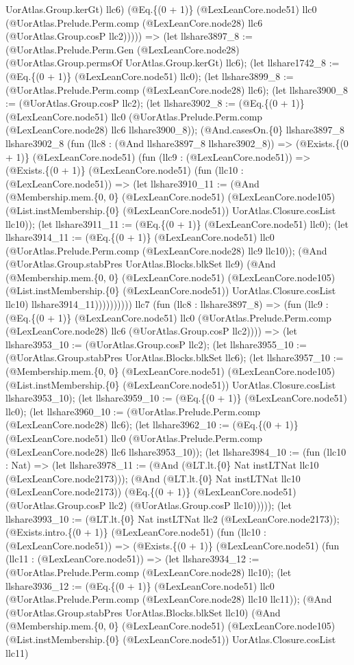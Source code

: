 \documentclass[11pt]{article}
\begin{document}
UorAtlas.Group.kerGt) llc6) (@Eq.\{(0 + 1)\} (@LexLeanCore.node51) llc0 (@UorAtlas.Prelude.Perm.comp (@LexLeanCore.node28) llc6 (@UorAtlas.Group.cosP llc2))))) => (let llshare3897\_8 := (@UorAtlas.Prelude.Perm.Gen (@LexLeanCore.node28) (@UorAtlas.Group.permsOf UorAtlas.Group.kerGt) llc6); (let llshare1742\_8 := (@Eq.\{(0 + 1)\} (@LexLeanCore.node51) llc0); (let llshare3899\_8 := (@UorAtlas.Prelude.Perm.comp (@LexLeanCore.node28) llc6); (let llshare3900\_8 := (@UorAtlas.Group.cosP llc2); (let llshare3902\_8 := (@Eq.\{(0 + 1)\} (@LexLeanCore.node51) llc0 (@UorAtlas.Prelude.Perm.comp (@LexLeanCore.node28) llc6 llshare3900\_8)); (@And.casesOn.\{0\} llshare3897\_8 llshare3902\_8 (fun (llc8 : (@And llshare3897\_8 llshare3902\_8)) => (@Exists.\{(0 + 1)\} (@LexLeanCore.node51) (fun (llc9 : (@LexLeanCore.node51)) => (@Exists.\{(0 + 1)\} (@LexLeanCore.node51) (fun (llc10 : (@LexLeanCore.node51)) => (let llshare3910\_11 := (@And (@Membership.mem.\{0, 0\} (@LexLeanCore.node51) (@LexLeanCore.node105) (@List.instMembership.\{0\} (@LexLeanCore.node51)) UorAtlas.Closure.cosList llc10)); (let llshare3911\_11 := (@Eq.\{(0 + 1)\} (@LexLeanCore.node51) llc0); (let llshare3914\_11 := (@Eq.\{(0 + 1)\} (@LexLeanCore.node51) llc0 (@UorAtlas.Prelude.Perm.comp (@LexLeanCore.node28) llc9 llc10)); (@And (@UorAtlas.Group.stabPres UorAtlas.Blocks.blkSet llc9) (@And (@Membership.mem.\{0, 0\} (@LexLeanCore.node51) (@LexLeanCore.node105) (@List.instMembership.\{0\} (@LexLeanCore.node51)) UorAtlas.Closure.cosList llc10) llshare3914\_11)))))))))) llc7 (fun (llc8 : llshare3897\_8) => (fun (llc9 : (@Eq.\{(0 + 1)\} (@LexLeanCore.node51) llc0 (@UorAtlas.Prelude.Perm.comp (@LexLeanCore.node28) llc6 (@UorAtlas.Group.cosP llc2)))) => (let llshare3953\_10 := (@UorAtlas.Group.cosP llc2); (let llshare3955\_10 := (@UorAtlas.Group.stabPres UorAtlas.Blocks.blkSet llc6); (let llshare3957\_10 := (@Membership.mem.\{0, 0\} (@LexLeanCore.node51) (@LexLeanCore.node105) (@List.instMembership.\{0\} (@LexLeanCore.node51)) UorAtlas.Closure.cosList llshare3953\_10); (let llshare3959\_10 := (@Eq.\{(0 + 1)\} (@LexLeanCore.node51) llc0); (let llshare3960\_10 := (@UorAtlas.Prelude.Perm.comp (@LexLeanCore.node28) llc6); (let llshare3962\_10 := (@Eq.\{(0 + 1)\} (@LexLeanCore.node51) llc0 (@UorAtlas.Prelude.Perm.comp (@LexLeanCore.node28) llc6 llshare3953\_10)); (let llshare3984\_10 := (fun (llc10 : Nat) => (let llshare3978\_11 := (@And (@LT.lt.\{0\} Nat instLTNat llc10 (@LexLeanCore.node2173))); (@And (@LT.lt.\{0\} Nat instLTNat llc10 (@LexLeanCore.node2173)) (@Eq.\{(0 + 1)\} (@LexLeanCore.node51) (@UorAtlas.Group.cosP llc2) (@UorAtlas.Group.cosP llc10))))); (let llshare3993\_10 := (@LT.lt.\{0\} Nat instLTNat llc2 (@LexLeanCore.node2173)); (@Exists.intro.\{(0 + 1)\} (@LexLeanCore.node51) (fun (llc10 : (@LexLeanCore.node51)) => (@Exists.\{(0 + 1)\} (@LexLeanCore.node51) (fun (llc11 : (@LexLeanCore.node51)) => (let llshare3934\_12 := (@UorAtlas.Prelude.Perm.comp (@LexLeanCore.node28) llc10); (let llshare3936\_12 := (@Eq.\{(0 + 1)\} (@LexLeanCore.node51) llc0 (@UorAtlas.Prelude.Perm.comp (@LexLeanCore.node28) llc10 llc11)); (@And (@UorAtlas.Group.stabPres UorAtlas.Blocks.blkSet llc10) (@And (@Membership.mem.\{0, 0\} (@LexLeanCore.node51) (@LexLeanCore.node105) (@List.instMembership.\{0\} (@LexLeanCore.node51)) UorAtlas.Closure.cosList llc11) 
\end{document}
